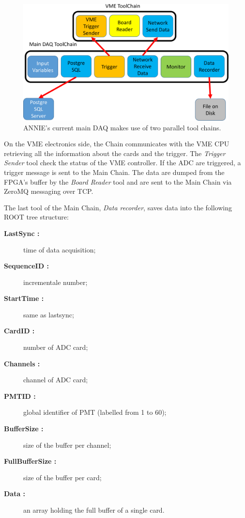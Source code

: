 \begin{figure}[]
  \centering
  \includegraphics[scale=0.20]{pics/pag2richardshkmeeting}
  \caption{ANNIE's current main DAQ makes use of two parallel tool chains.}
  \label{fig:anniedaq}
\end{figure}

On the VME electronics side, the Chain communicates with the VME CPU retrieving all the information %
about the cards and the trigger.
The \emph{Trigger Sender} tool check the status of the VME controller.
If the ADC are triggered, a trigger message is sent to the Main Chain.
The data are dumped from the FPGA's buffer by the \emph{Board Reader} tool and %
are sent to the Main Chain via ZeroMQ messaging over TCP.

The last tool of the Main Chain, \emph{Data recorder}, saves data into the following %
ROOT tree structure:
\begin{description}
  \item[\bfseries LastSync :] time of data acquisition;
  \item[\bfseries SequenceID :] incrementale number;
  \item[\bfseries StartTime :] same as lastsync;
  \item[\bfseries CardID :] number of ADC card;
  \item[\bfseries Channels :] channel of ADC card;
  \item[\bfseries PMTID :] global identifier of PMT (labelled from 1 to 60);
  \item[\bfseries BufferSize :] size of the buffer per channel;
  \item[\bfseries FullBufferSize :] size of the buffer per card;
  \item[\bfseries Data :] an array holding the full buffer of a single card.
\end{description}

